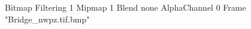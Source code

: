 {Bitmap
	{Filtering 1}
	{Mipmap 1}
	{Blend none}
	{AlphaChannel 0}
	{Frame "Bridge_nwpz.tif.bmp"}
}
